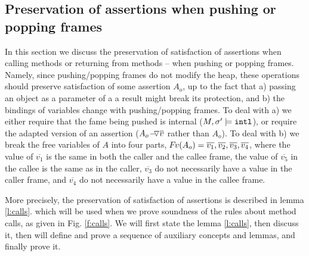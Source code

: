 \newcommand{\Ao}{A_{o}}

\subsection{Preservation of assertions when pushing or popping frames}

In this section we  discuss the preservation of satisfaction of assertions when calling methods or returning from methods -- \ie when pushing or popping  frames. 
Namely, since  pushing/popping frames  do not modify the heap, these operations should preserve satisfaction of some assertion $\Ao$, up to the fact that a) passing an object as a parameter of a a result might break its protection, and 
b) the bindings of variables change  with pushing/popping frames.
To deal with a) we either require that the fame being pushed is internal ($M, \sigma' \models \mbox{\normalfont{\texttt{intl}}}$), or require the adapted version of an assertion (\ie  ${\PushAS  {v} { \Ao}}$ rather than $\Ao$).
To deal with b) we break the free variables of $A$ into four parts, \ie $\fv(\Ao) =  \overline{v_1}, \overline{v_2}, \overline {v_3}, \overline {v_4} $, where the value of $\overline{v_1}$ is the same in both the caller and the callee frame, the value of $\overline {v_5}$ in the callee is the same as in the caller, $\overline {v_3}$ do not necessarily have a value in the caller frame, and $\overline {v_4}$ do not necessarily have a value in the callee frame.

More precisely, the preservation of satisfaction of assertions is described in  lemma \ref{l:calls}. 
 which will be used when we prove soundness of the rules about method calls, as given in Fig. \ref{f:calls}. 
%
We will first state  the lemma \ref{l:calls}, then discuss it,   then  will define and prove a sequence of auxiliary concepts and 
 lemmas, and finally prove it. %
 
